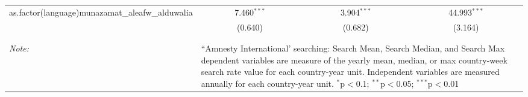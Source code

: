 \begin{table}[!htbp]
\begin{tabular}{@{\extracolsep{5pt}}lccc}
  as.factor(language)munazamat\_aleafw\_alduwalia & 7.460$^{***}$ & 3.904$^{***}$ & 44.993$^{***}$ \\ 
  & (0.640) & (0.682) & (3.164) \\ 
 \hline \\[-1.8ex] 
\hline 
\hline \\[-1.8ex] 
\textit{Note:}  & \multicolumn{3}{l}{\parbox[t]{8cm}{``Amnesty International' searching: Search Mean, Search Median, and Search Max dependent variables are measure of the yearly mean, median, or max country-week search rate value for each country-year unit. Independent variables are measured annually for each country-year unit. $^{*}$p$<$0.1; $^{**}$p$<$0.05; $^{***}$p$<$0.01}} \\ 
\end{tabular} 
\end{table} 
